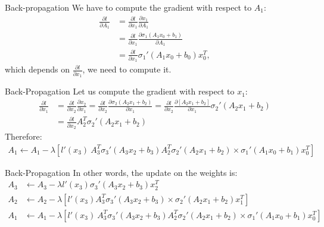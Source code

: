 \begin{frame}{Back-propagation}
	We have to compute the gradient with respect to $A_1$:
	\begin{align*}
		\frac{\partial l}{\partial A_1} & = \frac{\partial l}{\partial x_1}\frac{\partial x_1}{\partial A_1}                            \\
		                                & =\frac{\partial l}{\partial x_1}\frac{\partial \sigma_1\left(A_1x_0+b_1\right)}{\partial A_1} \\
		                                & =\frac{\partial l}{\partial x_1} \sigma_1'\left(A_1x_0+b_0\right)x_0^T,
	\end{align*}
	which depends on $\frac{\partial l}{\partial x_1}$, we need to compute it.
\end{frame}

\begin{frame}{Back-Propagation}
	Let us compute the gradient with respect to $x_1$:
	\begin{align*}
		\frac{\partial l}{\partial x_1} & = \frac{\partial l}{\partial x_2}\frac{\partial x_2}{\partial x_1} = \frac{\partial l}{\partial x_2}\frac{\partial \sigma_2\left(A_2x_1+b_2\right)}{\partial x_1} =  \frac{\partial l}{\partial x_2}\frac{\partial \left[A_2x_1+b_2\right]}{\partial x_1}\sigma_2'\left(A_2x_1+b_2\right) \\
		                                & = \frac{\partial l}{\partial x_2}A_2^T\sigma_2'\left(A_2x_1+b_2\right)
	\end{align*}
	Therefore:
	\begin{align*}
		A_1 \leftarrow A_1 - \lambda \left[l'(x_3)\:A_3^T\sigma_3'\left(A_3x_2+b_3\right)A_2^T\sigma_2'\left(A_2x_1+b_2\right) \times  \sigma_1'\left(A_1x_0+b_1\right)x_0^T \right]
	\end{align*}
\end{frame}

\begin{frame}{Back-Propagation}
	In other words, the update on the weights is:
	\begin{align*}
		A_3 & \leftarrow A_3 - \lambda l'(x_3)\sigma_3'\left(A_3x_2+b_3\right)x_2^T                                                                                                    \\
		A_2 & \leftarrow A_2 - \lambda \left[l'(x_3)A_3^T\sigma_3'\left(A_3x_2+b_3\right) \times  \sigma_2'\left(A_2x_1+b_2\right)x_1^T \right]                                        \\
		A_1 & \leftarrow A_1 - \lambda \left[l'(x_3)\:A_3^T\sigma_3'\left(A_3x_2+b_3\right)A_2^T\sigma_2'\left(A_2x_1+b_2\right) \times  \sigma_1'\left(A_1x_0+b_1\right)x_0^T \right]
	\end{align*}
\end{frame}



